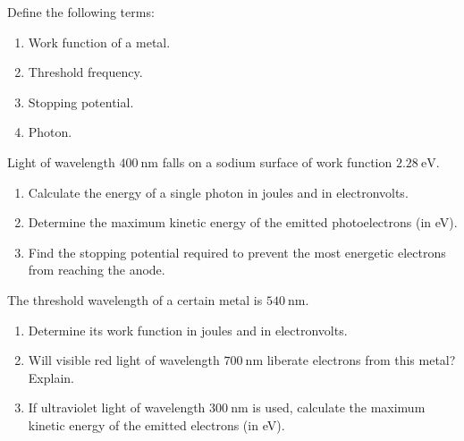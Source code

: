 \documentclass[11pt]{article}
\newcounter{popsec}
\newcounter{popsub}
\newcommand{\courssub}[1]{%
  \stepcounter{popsub}%
  \par\vspace{9pt}\noindent{\popxbold\fontsize{11.5}{13}\selectfont\color{popink}{\color{poporange}\thepopsec.\thepopsub}\hspace{6pt}#1}\par\nopagebreak\vspace{4pt}
}
\begin{document}
\begin{exercice}
Define the following terms:
\begin{enumerate}
\item Work function of a metal.
\item Threshold frequency.
\item Stopping potential.
\item Photon.
\end{enumerate}
\end{exercice}

\begin{exercice}
Light of wavelength \(400\ \mathrm{nm}\) falls on a sodium surface of work function \(2.28\ \mathrm{eV}\).
\begin{enumerate}
\item Calculate the energy of a single photon in joules and in electronvolts.
\item Determine the maximum kinetic energy of the emitted photoelectrons (in eV).
\item Find the stopping potential required to prevent the most energetic electrons from reaching the anode.
\end{enumerate}
\end{exercice}

\courssub{I practise}

\begin{exercice}
The threshold wavelength of a certain metal is \(540\ \mathrm{nm}\).
\begin{enumerate}
\item Determine its work function in joules and in electronvolts.
\item Will visible red light of wavelength \(700\ \mathrm{nm}\) liberate electrons from this metal? Explain.
\item If ultraviolet light of wavelength \(300\ \mathrm{nm}\) is used, calculate the maximum kinetic energy of the emitted electrons (in eV).
\end{enumerate}
\end{exercice}
\end{document}
